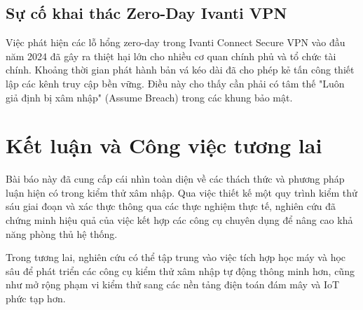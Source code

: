 \documentclass[conference]{IEEEtran}
\begin{document}
\subsection{Sự cố khai thác Zero-Day Ivanti VPN}
Việc phát hiện các lỗ hổng zero-day trong Ivanti Connect Secure VPN vào đầu năm 2024 đã gây ra thiệt hại lớn cho nhiều cơ quan chính phủ và tổ chức tài chính. Khoảng thời gian phát hành bản vá kéo dài đã cho phép kẻ tấn công thiết lập các kênh truy cập bền vững. Điều này cho thấy cần phải có tâm thế "Luôn giả định bị xâm nhập" (Assume Breach) trong các khung bảo mật.

\section{Kết luận và Công việc tương lai}
Bài báo này đã cung cấp cái nhìn toàn diện về các thách thức và phương pháp luận hiện có trong kiểm thử xâm nhập. Qua việc thiết kế một quy trình kiểm thử sáu giai đoạn và xác thực thông qua các thực nghiệm thực tế, nghiên cứu đã chứng minh hiệu quả của việc kết hợp các công cụ chuyên dụng để nâng cao khả năng phòng thủ hệ thống.

Trong tương lai, nghiên cứu có thể tập trung vào việc tích hợp học máy và học sâu để phát triển các công cụ kiểm thử xâm nhập tự động thông minh hơn, cũng như mở rộng phạm vi kiểm thử sang các nền tảng điện toán đám mây và IoT phức tạp hơn.
\end{document}

